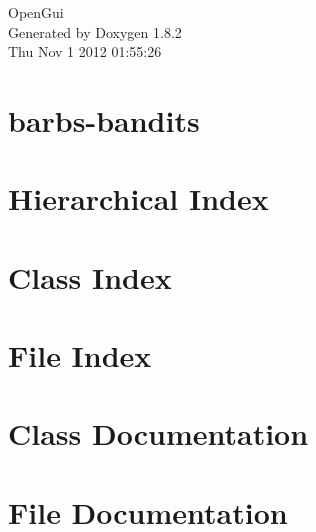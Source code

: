 \documentclass{book}
\begin{document}
\hypersetup{pageanchor=false,citecolor=blue}
\begin{titlepage}
\vspace*{7cm}
\begin{center}
{\Large Open\-Gui }\\
\vspace*{1cm}
{\large Generated by Doxygen 1.8.2}\\
\vspace*{0.5cm}
{\small Thu Nov 1 2012 01:55:26}\\
\end{center}
\end{titlepage}
\clearemptydoublepage
{}
\tableofcontents
\clearemptydoublepage
{}
\hypersetup{pageanchor=true,citecolor=blue}
\chapter{barbs-\/bandits}
\label{md_README}
\hypertarget{md_README}{}

\chapter{Hierarchical Index}

\chapter{Class Index}

\chapter{File Index}

\chapter{Class Documentation}









\chapter{File Documentation}






















\printindex
\end{document}
